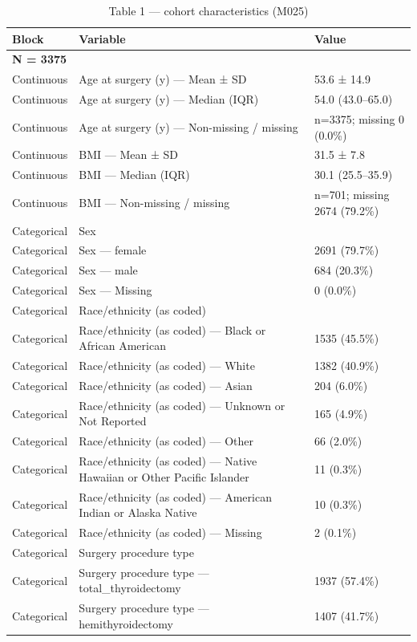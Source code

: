 \begin{table}[htbp]
\centering
\caption{Table 1 — cohort characteristics (M025)}
\label{tab:table1\_m025}
\begin{tabular}{lll}
\toprule
Block & Variable & Value \\
\midrule
\multicolumn{3}{l}{\textbf{N = 3375}} \\
Continuous & Age at surgery (y) — Mean ± SD & 53.6 ± 14.9 \\
Continuous & Age at surgery (y) — Median (IQR) & 54.0 (43.0–65.0) \\
Continuous & Age at surgery (y) — Non-missing / missing & n=3375; missing 0 (0.0\%) \\
Continuous & BMI — Mean ± SD & 31.5 ± 7.8 \\
Continuous & BMI — Median (IQR) & 30.1 (25.5–35.9) \\
Continuous & BMI — Non-missing / missing & n=701; missing 2674 (79.2\%) \\
Categorical & Sex &  \\
Categorical & Sex — female & 2691 (79.7\%) \\
Categorical & Sex — male & 684 (20.3\%) \\
Categorical & Sex — Missing & 0 (0.0\%) \\
Categorical & Race/ethnicity (as coded) &  \\
Categorical & Race/ethnicity (as coded) — Black or African American & 1535 (45.5\%) \\
Categorical & Race/ethnicity (as coded) — White & 1382 (40.9\%) \\
Categorical & Race/ethnicity (as coded) — Asian & 204 (6.0\%) \\
Categorical & Race/ethnicity (as coded) — Unknown or Not Reported & 165 (4.9\%) \\
Categorical & Race/ethnicity (as coded) — Other & 66 (2.0\%) \\
Categorical & Race/ethnicity (as coded) — Native Hawaiian or Other Pacific Islander & 11 (0.3\%) \\
Categorical & Race/ethnicity (as coded) — American Indian or Alaska Native & 10 (0.3\%) \\
Categorical & Race/ethnicity (as coded) — Missing & 2 (0.1\%) \\
Categorical & Surgery procedure type &  \\
Categorical & Surgery procedure type — total\_thyroidectomy & 1937 (57.4\%) \\
Categorical & Surgery procedure type — hemithyroidectomy & 1407 (41.7\%) \\

\end{tabular}
\end{table}
